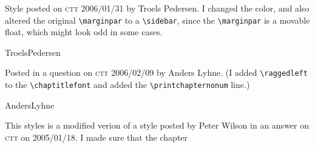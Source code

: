 Style posted on \textsc{ctt} 2006/01/31 by Troels
Pedersen. I changed the color, and also altered the original
\verb+\marginpar+ to a \verb+\sidebar+, since the \verb+\marginpar+ is
a movable float, which might look odd in some cases.
\begin{showchapterstyle}{TroelsPedersen}
\usepackage{graphicx,color}
\makeatletter
\newlength{\numberheight}
\makeatother 
\end{showchapterstyle}
Posted in a question on \textsc{ctt} 2006/02/09 by Anders Lyhne. (I
added \verb+\raggedleft+ to the \verb+\chaptitlefont+ and added the
\verb+\printchapternonum+  line.) 
\begin{showchapterstyle}{AndersLyhne}
\usepackage{graphicx}
\end{showchapterstyle}
%
This styles is a modified verion of a style posted by Peter Wilson in
an answer on \textsc{ctt} on 2005/01/18. I made sure that the chapter
